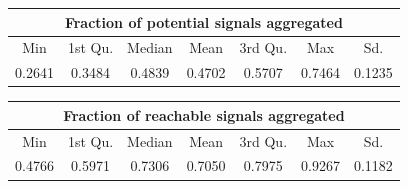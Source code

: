 \begin{centering}
\begin{tabular}{|c|c|c|c|c|c|c|}
\hline
\multicolumn{7}{|c|}{Fraction of potential signals aggregated}\tabularnewline
\hline
Min & 1st Qu. & Median & Mean & 3rd Qu. & Max & Sd.\tabularnewline
\hline
\hline
0.2641 & 0.3484 & 0.4839 & 0.4702 & 0.5707 & 0.7464 & 0.1235\tabularnewline
\hline
\end{tabular}
\par\end{centering}
\begin{centering}
\begin{tabular}{|c|c|c|c|c|c|c|}
\hline
\multicolumn{7}{|c|}{Fraction of reachable signals aggregated}\tabularnewline
\hline
Min & 1st Qu. & Median & Mean & 3rd Qu. & Max & Sd.\tabularnewline
\hline
\hline
0.4766 & 0.5971 & 0.7306 & 0.7050 & 0.7975 & 0.9267 & 0.1182\tabularnewline
\hline
\end{tabular}
\par\end{centering}
